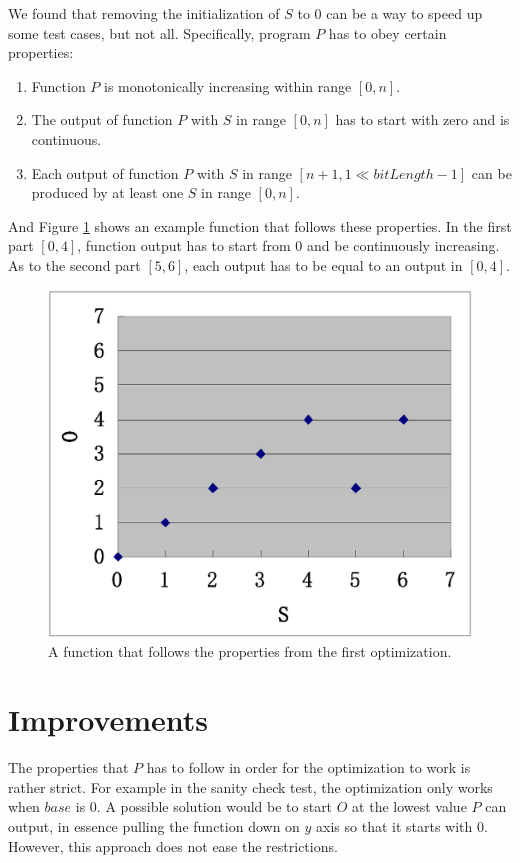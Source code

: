 We found that removing the initialization of $S$ to $0$ can be a way to speed up some test cases, but not all. Specifically, program $P$ has to obey certain properties:

\begin{enumerate}
\item Function $P$ is monotonically increasing within range $[0, n]$.
\item The output of function $P$ with $S$ in range $[0, n]$ has to start with zero and is continuous.
\item Each output of function $P$ with $S$ in range $[n+1, 1\ll bitLength-1]$ can be produced by at least one $S$ in range $[0, n]$.
\end{enumerate}

And Figure \ref{fig:1stTry} shows an example function that follows these properties. In the first part $[0, 4]$, function output has to start from $0$ and be continuously increasing. As to the second part $[5, 6]$, each output has to be equal to an output in $[0, 4]$.

\begin{figure}
\centering
\includegraphics[scale=0.8]{Figures/1stTry}
\caption{A function that follows the properties from the first optimization.}
\label{fig:1stTry}
\end{figure}

\section{Improvements}
The properties that $P$ has to follow in order for the optimization to work is rather strict. For example in the sanity check test, the optimization only works when $base$ is $0$. A possible solution would be to start $O$ at the lowest value $P$ can output, in essence pulling the function down on $y$ axis so that it starts with $0$. However, this approach does not ease the restrictions.

